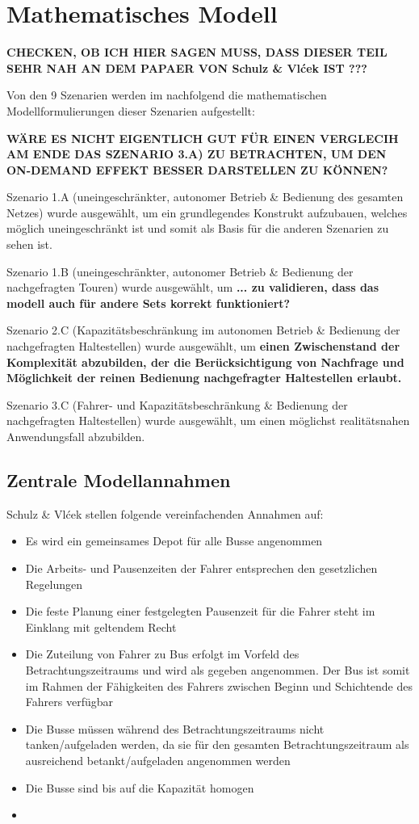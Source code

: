 \chapter{Mathematisches Modell}
\label{chapter:4}

\textbf{CHECKEN, OB ICH HIER SAGEN MUSS, DASS DIESER TEIL SEHR NAH AN DEM PAPAER VON Schulz \& Vlćek IST ???}

Von den 9 Szenarien werden im nachfolgend die mathematischen Modellformulierungen dieser Szenarien aufgestellt:

\textbf{WÄRE ES NICHT EIGENTLICH GUT FÜR EINEN VERGLECIH AM ENDE DAS SZENARIO 3.A) ZU BETRACHTEN, UM DEN ON-DEMAND EFFEKT BESSER DARSTELLEN ZU KÖNNEN?}

Szenario 1.A (uneingeschränkter, autonomer Betrieb \& Bedienung des gesamten Netzes) wurde ausgewählt, um ein grundlegendes Konstrukt aufzubauen, welches möglich uneingeschränkt ist und somit als Basis für die anderen Szenarien zu sehen ist.

Szenario 1.B (uneingeschränkter, autonomer Betrieb \& Bedienung der nachgefragten Touren) wurde ausgewählt, um \textbf{... zu validieren, dass das modell auch für andere Sets korrekt funktioniert?}

Szenario 2.C (Kapazitätsbeschränkung im autonomen Betrieb \& Bedienung der nachgefragten Haltestellen) wurde ausgewählt, um  \textbf{einen Zwischenstand der Komplexität abzubilden, der die Berücksichtigung von Nachfrage und Möglichkeit der reinen Bedienung nachgefragter Haltestellen erlaubt.}

Szenario 3.C (Fahrer- und Kapazitätsbeschränkung \& Bedienung der nachgefragten Haltestellen) wurde ausgewählt, um einen möglichst realitätsnahen Anwendungsfall abzubilden.

\section{Zentrale Modellannahmen}
\label{sec:4.1}
Schulz \& Vlćek stellen folgende vereinfachenden Annahmen auf:
\begin{itemize}
    \item Es wird ein gemeinsames Depot für alle Busse angenommen
    \item Die Arbeits- und Pausenzeiten der Fahrer entsprechen den gesetzlichen Regelungen
    \item Die feste Planung einer festgelegten Pausenzeit für die Fahrer steht im Einklang mit geltendem Recht
    \item Die Zuteilung von Fahrer zu Bus erfolgt im Vorfeld des Betrachtungszeitraums und wird als gegeben angenommen. Der Bus ist somit im Rahmen der Fähigkeiten des Fahrers zwischen Beginn und  Schichtende des Fahrers verfügbar
    \item Die Busse müssen während des Betrachtungszeitraums nicht tanken/aufgeladen werden, da sie für den gesamten Betrachtungszeitraum als ausreichend betankt/aufgeladen angenommen werden
    \item Die Busse sind bis auf die Kapazität homogen
    \item 
\end{itemize}

